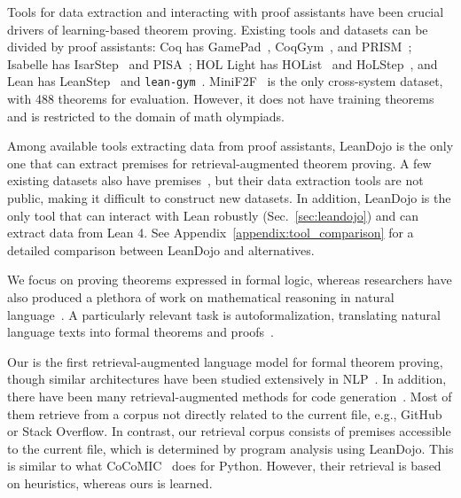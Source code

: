 Tools for data extraction and interacting with proof assistants have been crucial drivers of learning-based theorem proving. Existing tools and datasets can be divided by proof assistants: Coq has GamePad~\cite{huanggamepad}, CoqGym~\cite{yang2019learning}, and PRISM~\cite{reichel2023proof}; Isabelle has IsarStep~\cite{li2021isarstep} and PISA~\cite{jiang2021lisa}; HOL Light has HOList~\cite{bansal2019holist} and HoLStep~\cite{kaliszykholstep}, and Lean has LeanStep~\cite{han2022proof} and \texttt{lean-gym}~\cite{polu2023formal}. MiniF2F~\cite{zheng2022minif2f} is the only cross-system dataset, with 488 theorems for evaluation. However, it does not have training theorems and is restricted to the domain of math olympiads. 
 
Among available tools extracting data from proof assistants, LeanDojo is the only one that can extract premises for retrieval-augmented theorem proving. A few existing datasets also have premises~\cite{bansal2019holist,mikula2023magnushammer}, but their data extraction tools are not public, making it difficult to construct new datasets. In addition, LeanDojo is the only tool that can interact with Lean robustly (Sec.~\ref{sec:leandojo}) and can extract data from Lean 4. See Appendix~\ref{appendix:tool_comparison} for a detailed comparison between LeanDojo and alternatives.


We focus on proving theorems expressed in formal logic, whereas researchers have also produced a plethora of work on mathematical reasoning in natural language~\cite{hendrycks2021measuring,lewkowycz2022solving,ferreira2020premise,welleck2021naturalproofs,welleck2022naturalprover,mishra2022lila,lu2022survey,meadows2022survey}. A particularly relevant task is autoformalization, translating natural language texts into formal theorems and proofs~\cite{wang2018first,cosler2023nl2spec,pan2023data,hahn2022formal,wu2022autoformalization,jiang2023draft,zhao2023decomposing,cunningham2023towards,azerbayev2023proofnet,chen2023nl2tl}. 

Our {\name} is the first retrieval-augmented language model for formal theorem proving, though similar architectures have been studied extensively in NLP~\cite{khandelwal2020generalization,guu2020retrieval,lewis2020retrieval,borgeaud2022improving,li2022decoupled,jiang2022retrieval,wu2022memorizing,izacard2022few,zhong2022training}. In addition, there have been many retrieval-augmented methods for code generation~\cite{hayati2018retrieval,parvez2021retrieval,lu2022reacc,zhou2023docprompting,shrivastava2022repository,zhang2023repocoder,ding2022cocomic}. Most of them retrieve from a corpus not directly related to the current file, e.g., GitHub or Stack Overflow. In contrast, our retrieval corpus consists of premises accessible to the current file, which is determined by program analysis using LeanDojo. This is similar to what CoCoMIC~\cite{ding2022cocomic} does for Python. However, their retrieval is based on heuristics, whereas ours is learned. 